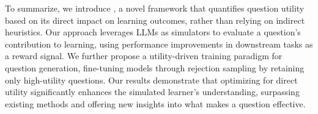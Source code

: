 To summarize, we introduce \ours, a novel framework that quantifies question utility based on its direct impact on learning outcomes, rather than relying on indirect heuristics. 
Our approach leverages LLMs as simulators to evaluate a question’s contribution to learning, using performance improvements in downstream tasks as a reward signal.
We further propose a utility-driven training paradigm for question generation, fine-tuning models through rejection sampling by retaining only high-utility questions.
Our results demonstrate that optimizing for direct utility significantly enhances the simulated learner’s understanding, surpassing existing methods and offering new insights into what makes a question effective.






































